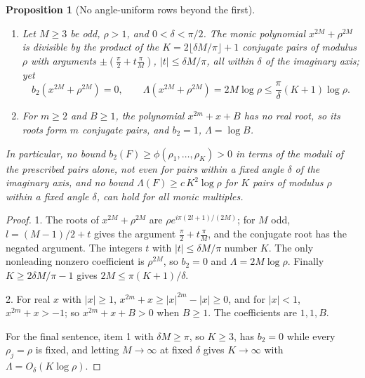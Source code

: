 \documentclass[11pt]{article}
\newtheorem{proposition}[theorem]{Proposition}
\begin{document}
\begin{proposition}[No angle-uniform rows beyond the first]
\label{prop:noangle}
\leavevmode
\begin{enumerate}
\item Let $M\ge3$ be odd, $\rho>1$, and $0<\delta<\pi/2$.  The monic
polynomial $x^{2M}+\rho^{2M}$ is divisible by the product of the
$K=2\lfloor\delta M/\pi\rfloor+1$ conjugate pairs of modulus $\rho$ with
arguments $\pm(\frac\pi2+t\frac\pi M)$, $|t|\le\delta M/\pi$, all within
$\delta$ of the imaginary axis; yet
\[
  b_2(x^{2M}+\rho^{2M})=0,\qquad
  \Lambda(x^{2M}+\rho^{2M})=2M\log\rho\le\frac\pi\delta(K+1)\log\rho .
\]
\item For $m\ge2$ and $B\ge1$, the polynomial $x^{2m}+x+B$ has no real
root, so its roots form $m$ conjugate pairs, and $b_2=1$,
$\Lambda=\log B$.
\end{enumerate}
In particular, no bound $b_2(F)\ge\phi(\rho_1,\ldots,\rho_K)>0$ in terms of
the moduli of the prescribed pairs alone, not even for pairs within a fixed
angle $\delta$ of the imaginary axis, and no bound
$\Lambda(F)\ge c\,K^2\log\rho$ for $K$ pairs of modulus $\rho$ within a
fixed angle $\delta$, can hold for all monic multiples.
\end{proposition}

\begin{proof}
1.  The roots of $x^{2M}+\rho^{2M}$ are $\rho e^{i\pi(2l+1)/(2M)}$; for
$M$ odd, $l=(M-1)/2+t$ gives the argument $\frac\pi2+t\frac\pi M$, and the
conjugate root has the negated argument.  The integers $t$ with
$|t|\le\delta M/\pi$ number $K$.  The only nonleading nonzero coefficient
is $\rho^{2M}$, so $b_2=0$ and $\Lambda=2M\log\rho$.  Finally
$K\ge2\delta M/\pi-1$ gives $2M\le\pi(K+1)/\delta$.

2.  For real $x$ with $|x|\ge1$, $x^{2m}+x\ge|x|^{2m}-|x|\ge0$, and for
$|x|<1$, $x^{2m}+x>-1$; so $x^{2m}+x+B>0$ when $B\ge1$.  The coefficients are
$1,1,B$.

For the final sentence, item 1 with $\delta M\ge\pi$, so $K\ge3$, has $b_2=0$ while every
$\rho_j=\rho$ is fixed, and letting $M\to\infty$ at fixed $\delta$ gives
$K\to\infty$ with $\Lambda=O_\delta(K\log\rho)$.
\end{proof}
\end{document}
